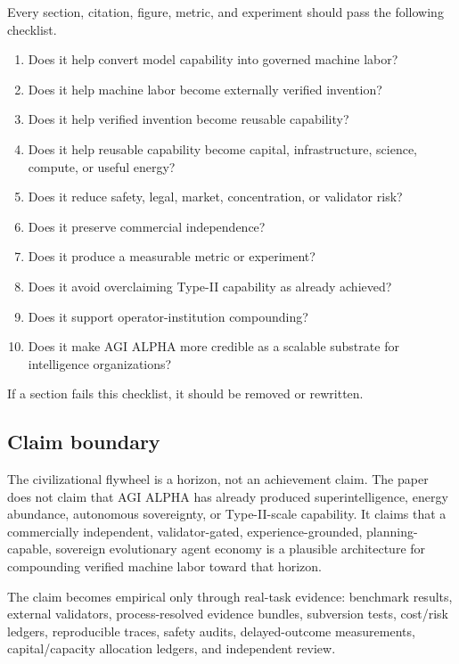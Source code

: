 Every section, citation, figure, metric, and experiment should pass the
following checklist.

\begin{enumerate}
\def\labelenumi{\arabic{enumi}.}
\tightlist
\item
  Does it help convert model capability into governed machine labor?
\item
  Does it help machine labor become externally verified invention?
\item
  Does it help verified invention become reusable capability?
\item
  Does it help reusable capability become capital, infrastructure,
  science, compute, or useful energy?
\item
  Does it reduce safety, legal, market, concentration, or validator
  risk?
\item
  Does it preserve commercial independence?
\item
  Does it produce a measurable metric or experiment?
\item
  Does it avoid overclaiming Type-II capability as already achieved?
\item
  Does it support operator-institution compounding?
\item
  Does it make AGI ALPHA more credible as a scalable substrate for
  intelligence organizations?
\end{enumerate}

If a section fails this checklist, it should be removed or rewritten.

\subsection{Claim boundary}\label{claim-boundary}

The civilizational flywheel is a horizon, not an achievement claim. The
paper does not claim that AGI ALPHA has already produced
superintelligence, energy abundance, autonomous sovereignty, or
Type-II-scale capability. It claims that a commercially independent,
validator-gated, experience-grounded, planning-capable, sovereign
evolutionary agent economy is a plausible architecture for compounding
verified machine labor toward that horizon.

The claim becomes empirical only through real-task evidence: benchmark
results, external validators, process-resolved evidence bundles,
subversion tests, cost/risk ledgers, reproducible traces, safety audits,
delayed-outcome measurements, capital/capacity allocation ledgers, and
independent review.

